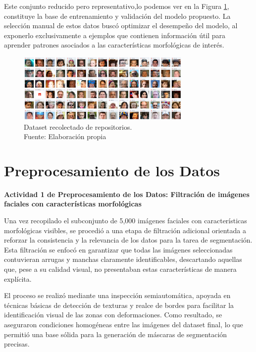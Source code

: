 Este conjunto reducido pero representativo,lo podemos ver en la Figura \ref{4:fig1}, constituye la base de entrenamiento y validación del modelo propuesto. La selección manual de estos datos buscó optimizar el desempeño del modelo, al exponerlo exclusivamente a ejemplos que contienen información útil para aprender patrones asociados a las características morfológicas de interés.

\begin{figure}[h]
	\begin{center}
		\includegraphics[width=0.75\textwidth]{4/figures/data.png}
		\caption[Dataset recolectado de repositorios]{Dataset recolectado de repositorios.\\
		Fuente: Elaboración propia}
		\label{4:fig1}
	\end{center}
\end{figure}

\section{Preprocesamiento de los Datos}

\textbf{Actividad 1 de Preprocesamiento de los Datos: Filtración de imágenes faciales con características morfológicas}

Una vez recopilado el subconjunto de 5,000 imágenes faciales con características morfológicas visibles, se procedió a una etapa de filtración adicional orientada a reforzar la consistencia y la relevancia de los datos para la tarea de segmentación. Esta filtración se enfocó en garantizar que todas las imágenes seleccionadas contuvieran arrugas y manchas claramente identificables, descartando aquellas que, pese a su calidad visual, no presentaban estas características de manera explícita.

El proceso se realizó mediante una inspección semiautomática, apoyada en técnicas básicas de detección de texturas y realce de bordes para facilitar la identificación visual de las zonas con deformaciones. Como resultado, se aseguraron condiciones homogéneas entre las imágenes del dataset final, lo que permitió una base sólida para la generación de máscaras de segmentación precisas.

